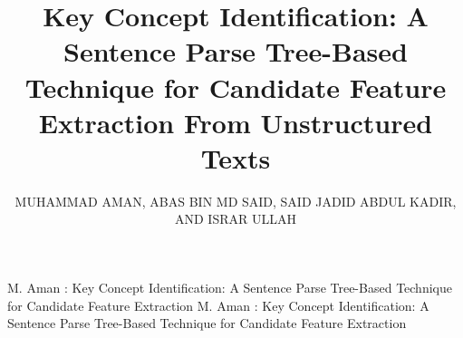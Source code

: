 \documentclass{ieeeaccess}
\begin{document}

\title{Key Concept Identification: A Sentence Parse
Tree-Based Technique for Candidate Feature
Extraction From Unstructured Texts}

\author{\uppercase{MUHAMMAD AMAN}, \uppercase{ABAS BIN MD SAID}, \uppercase{SAID JADID ABDUL KADIR}, \\
\uppercase{AND ISRAR ULLAH}}

\address[1]{Department of Computer and Information Sciences, Universiti Teknologi Petronas, Seri Iskandar 32610, Malaysia}
\address[2]{Computer Engineering Department, Jeju National University, Jeju 63243, South Korea}


\markboth
{M. Aman \headeretal:  Key Concept Identification: A Sentence Parse Tree-Based Technique for Candidate Feature Extraction}
{M. Aman  \headeretal:  Key Concept Identification: A Sentence Parse Tree-Based Technique for Candidate Feature Extraction}

\end{document}
